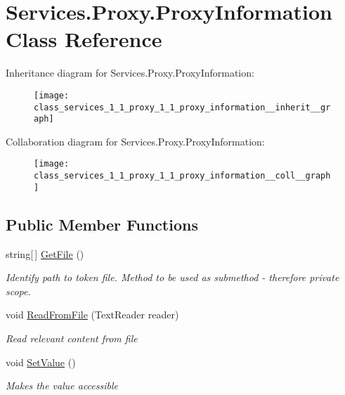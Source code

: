 \hypertarget{class_services_1_1_proxy_1_1_proxy_information}{}\section{Services.\+Proxy.\+Proxy\+Information Class Reference}
\label{class_services_1_1_proxy_1_1_proxy_information}


Inheritance diagram for Services.\+Proxy.\+Proxy\+Information\+:
\nopagebreak
\begin{figure}[H]
\begin{center}
\leavevmode
\texttt{[image: class\_services\_1\_1\_proxy\_1\_1\_proxy\_information\_\_inherit\_\_graph]}
\end{center}
\end{figure}


Collaboration diagram for Services.\+Proxy.\+Proxy\+Information\+:
\nopagebreak
\begin{figure}[H]
\begin{center}
\leavevmode
\texttt{[image: class\_services\_1\_1\_proxy\_1\_1\_proxy\_information\_\_coll\_\_graph]}
\end{center}
\end{figure}
\subsection*{Public Member Functions}
\begin{DoxyCompactItemize}
\item 
string\mbox{[}$\,$\mbox{]} \hyperlink{class_services_1_1_proxy_1_1_proxy_information_ac775377976e6b9a38de042bf29440174}{Get\+File} ()
\begin{DoxyCompactList}\small\item\em Identify path to token file. Method to be used as submethod -\/ therefore private scope. \end{DoxyCompactList}\item 
void \hyperlink{class_services_1_1_proxy_1_1_proxy_information_abb9b80a08af3fd6458a68ad258113664}{Read\+From\+File} (Text\+Reader reader)
\begin{DoxyCompactList}\small\item\em Read relevant content from file \end{DoxyCompactList}\item 
void \hyperlink{class_services_1_1_proxy_1_1_proxy_information_aff83ebf7729262cfe2840c26a9ef73f0}{Set\+Value} ()
\begin{DoxyCompactList}\small\item\em Makes the value accessible \end{DoxyCompactList}\end{DoxyCompactItemize}
